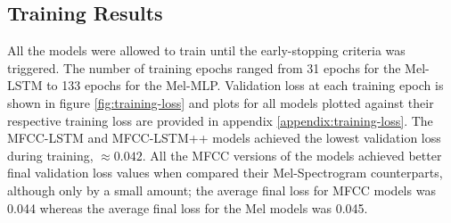 \subsection{Training Results}
All the models were allowed to train until the early-stopping criteria was triggered. The number of training epochs ranged from 31 epochs for the Mel-LSTM to 133 epochs for the Mel-MLP.
Validation loss at each training epoch is shown in figure \ref{fig:training-loss} and plots for all models plotted against their respective training loss are provided in appendix \ref{appendix:training-loss}. The MFCC-LSTM and MFCC-LSTM++ models achieved the lowest validation loss during training, $\approx 0.042$. All the MFCC versions of the models achieved better final validation loss values when compared their Mel-Spectrogram counterparts, although only by a small amount; the average final loss for MFCC models was 0.044 whereas the average final loss for the Mel models was 0.045.

